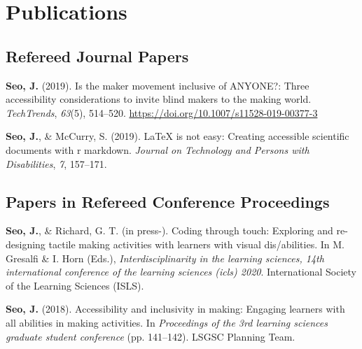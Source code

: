 \documentclass[11pt, a4paper]{awesome-cv}
\begin{document}
\hypertarget{publications}{%
\section{Publications}\label{publications}}

\hypertarget{refereed-journal-papers}{%
\subsection{Refereed Journal Papers}\label{refereed-journal-papers}}

\begingroup
\setlength{\parindent}{-0.5in}
\setlength{\leftskip}{0.5in}

\hypertarget{refs_journals}{}
\leavevmode\hypertarget{ref-seo2019maker}{}%
\textbf{Seo, J.} (2019). Is the maker movement inclusive of ANYONE?:
Three accessibility considerations to invite blind makers to the making
world. \emph{TechTrends}, \emph{63}(5), 514--520.
\url{https://doi.org/10.1007/s11528-019-00377-3}

\leavevmode\hypertarget{ref-seo2019arow}{}%
\textbf{Seo, J.}, \& McCurry, S. (2019). LaTeX is not easy: Creating
accessible scientific documents with r markdown. \emph{Journal on
Technology and Persons with Disabilities}, \emph{7}, 157--171.

\endgroup

\hypertarget{papers-in-refereed-conference-proceedings}{%
\subsection{Papers in Refereed Conference
Proceedings}\label{papers-in-refereed-conference-proceedings}}

\begingroup
\setlength{\parindent}{-0.5in}
\setlength{\leftskip}{0.5in}

\hypertarget{refs_proceedings}{}
\leavevmode\hypertarget{ref-seo2020coding}{}%
\textbf{Seo, J.}, \& Richard, G. T. (in press-). Coding through touch:
Exploring and re-designing tactile making activities with learners with
visual dis/abilities. In M. Gresalfi \& I. Horn (Eds.),
\emph{Interdisciplinarity in the learning sciences, 14th international
conference of the learning sciences (icls) 2020}. International Society
of the Learning Sciences (ISLS).

\leavevmode\hypertarget{ref-seo2018making}{}%
\textbf{Seo, J.} (2018). Accessibility and inclusivity in making:
Engaging learners with all abilities in making activities. In
\emph{Proceedings of the 3rd learning sciences graduate student
conference} (pp. 141--142). LSGSC Planning Team.
\end{document}
